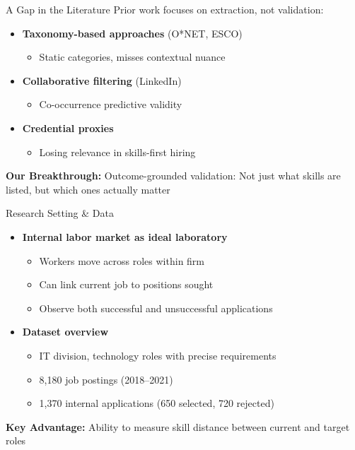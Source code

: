 \documentclass{beamer}
\begin{document}
\begin{frame}{A Gap in the Literature}
Prior work focuses on extraction, not validation:
\begin{itemize}
    \item \textbf{Taxonomy-based approaches} (O*NET, ESCO)
    \begin{itemize}
        \item Static categories, misses contextual nuance
    \end{itemize}
    \item \textbf{Collaborative filtering} (LinkedIn)
    \begin{itemize}
        \item Co-occurrence predictive validity
    \end{itemize}
    \item \textbf{Credential proxies}
    \begin{itemize}
        \item Losing relevance in skills-first hiring
    \end{itemize}
\end{itemize}

\begin{tcolorbox}[colback=boxbackground,colframe=boxframe,sharp corners]
\textbf{Our Breakthrough:} Outcome-grounded validation: Not just what skills are listed, but which ones actually matter
\end{tcolorbox}
\end{frame}

\begin{frame}{Research Setting \& Data}
\begin{itemize}
    \item \textbf{Internal labor market as ideal laboratory}
    \begin{itemize}
        \item Workers move across roles within firm
        \item Can link current job to positions sought
        \item Observe both successful and unsuccessful applications
    \end{itemize}
    \item \textbf{Dataset overview}
    \begin{itemize}
        \item IT division, technology roles with precise requirements
        \item 8,180 job postings (2018--2021)
        \item 1,370 internal applications (650 selected, 720 rejected)
    \end{itemize}
\end{itemize}

\begin{tcolorbox}[colback=boxbackground,colframe=boxframe,sharp corners]
\textbf{Key Advantage:} Ability to measure skill distance between current and target roles
\end{tcolorbox}
\end{frame}
\end{document}
